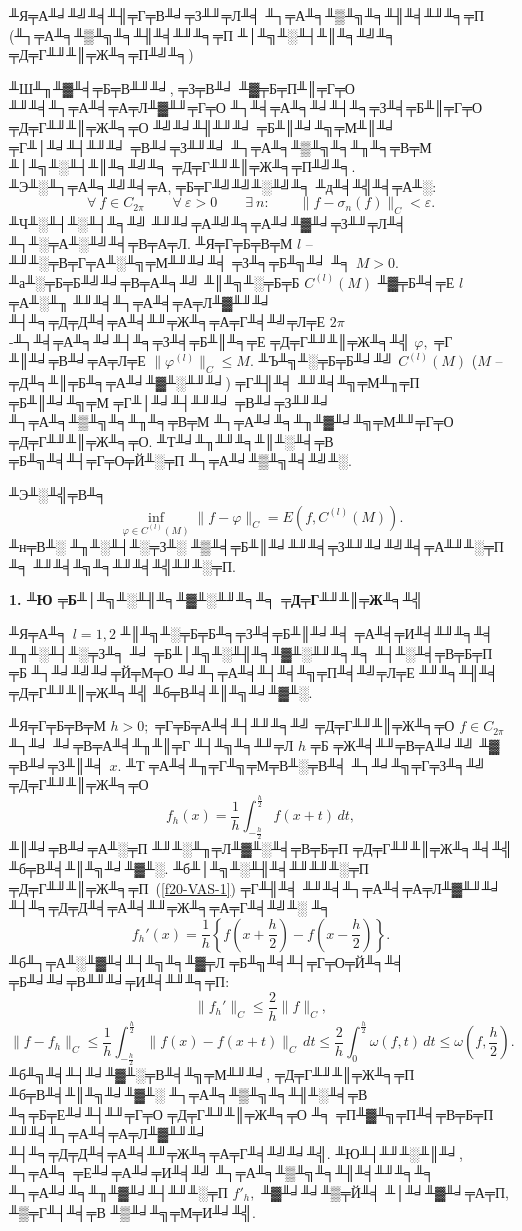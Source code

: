  {╨Я╤А╨╛╨╝╨╡╨╢╤Г╤В╨╛╤З╨╜╤Л╨╡ ╨┐╤А╨╕╨▒╨╗╨╕╨╢╨╡╨╜╨╕╤П (╨┐╤А╨╕╨▒╨╗╨╕╨╢╨╡╨╜╨╕╤П ╨│╨╗╨░╨┤╨║╨╕╨╝╨╕
 ╤Д╤Г╨╜╨║╤Ж╨╕╤П╨╝╨╕)}
 \vspace{3mm}

 ╨Ш╨╖╨▓╨╡╤Б╤В╨╜╨╛, ╤З╤В╨╛ ╨▓╤Б╤П╨║╤Г╤О ╨╜╨╡╨┐╤А╨╡╤А╤Л╨▓╨╜╤Г╤О ╨┐╨╡╤А╨╕╨╛╨┤╨╕╤З╨╡╤Б╨║╤Г╤О  ╤Д╤Г╨╜╨║╤Ж╨╕╤О ╨╝╨╛╨╢╨╜╨╛ ╤Б╨║╨╛╨╗╤М╨║╨╛ ╤Г╨│╨╛╨┤╨╜╨╛
 ╤В╨╛╤З╨╜╨╛ ╨┐╤А╨╕╨▒╨╗╨╕╨╖╨╕╤В╤М ╨│╨╗╨░╨┤╨║╨╕╨╝╨╕ ╤Д╤Г╨╜╨║╤Ж╨╕╤П╨╝╨╕. ╨Э╨░╨┐╤А╨╕╨╝╨╡╤А, ╤Б╤Г╨╝╨╝╨░╨╝╨╕
 ╨д╨╡╨╣╨╡╤А╨░:
 $$
 \forall\ f\in C_{{2\pi}}\qquad \forall\ \varepsilon>0\qquad \exists\ n:\qquad
 \|f-\sigma_n{(f)}\|_C<\varepsilon.
 $$
 ╨Ч╨░╨┤╨░╨┤╨╕╨╝ ╨╜╨╛╤А╨╝╨╕╤А╨╛╨▓╨╛╤З╨╜╤Л╨╡ ╨┐╨░╤А╨░╨╝╨╡╤В╤А╤Л. ╨Я╤Г╤Б╤В╤М $l$
 -- ╨╜╨░╤В╤Г╤А╨░╨╗╤М╨╜╨╛╨╡ ╤З╨╕╤Б╨╗╨╛ ╨╕ $M>0.$ ╨а╨░╤Б╤Б╨╝╨╛╤В╤А╨╕╨╝ ╨║╨╗╨░╤Б╤Б $C^{(l)}(M)$ ╨▓╤Б╨╡╤Е
 $l$ ╤А╨░╨╖ ╨╜╨╡╨┐╤А╨╡╤А╤Л╨▓╨╜╨╛ ╨┤╨╕╤Д╤Д╨╡╤А╨╡╨╜╤Ж╨╕╤А╤Г╨╡╨╝╤Л╤Е $2\pi$-╨┐╨╡╤А╨╕╨╛╨┤╨╕╤З╨╡╤Б╨║╨╕╤Е
 ╤Д╤Г╨╜╨║╤Ж╨╕╨╣ $\varphi,$ ╤Г ╨║╨╛╤В╨╛╤А╤Л╤Е  $\|\varphi^{(l)}\|_C\le M.$
 ╨Ъ╨╗╨░╤Б╤Б╨╛╨╝ $C^{(l)}(M)$ ($M$ -- ╤Д╨╕╨║╤Б╨╕╤А╨╛╨▓╨░╨╜╨╛) ╤Г╨╢╨╡ ╨╜╨╡╨╗╤М╨╖╤П  ╤Б╨║╨╛╨╗╤М ╤Г╨│╨╛╨┤╨╜╨╛ ╤В╨╛╤З╨╜╨╛
 ╨┐╤А╨╕╨▒╨╗╨╕╨╖╨╕╤В╤М ╨┐╤А╨╛╨╕╨╖╨▓╨╛╨╗╤М╨╜╤Г╤О
 ╤Д╤Г╨╜╨║╤Ж╨╕╤О. ╨Т╨╛╨╖╨╜╨╕╨║╨░╨╡╤В ╤Б╨╗╨╡╨┤╤Г╤О╤Й╨░╤П ╨┐╤А╨╛╨▒╨╗╨╡╨╝╨░.

 \task %
 ╨Э╨░╨╣╤В╨╕
 $$
 \inf_{\varphi\in C^{(l)}(M)} \|f-\varphi\|_C=E(f,C^{(l)}(M)).
 $$
 ╨н╤В╨░ ╨╖╨░╨┤╨░╤З╨░ ╨▒╨╡╤Б╨║╨╛╨╜╨╡╤З╨╜╨╛╨╝╨╡╤А╨╜╨░╤П ╨╕ ╨╜╨╡╨╗╨╕╨╜╨╡╨╣╨╜╨░╤П.

\vspace{3mm}
 {\bf 1. ╨Ю ╤Б╨│╨╗╨░╨╢╨╕╨▓╨░╨╜╨╕╨╕ ╤Д╤Г╨╜╨║╤Ж╨╕╨╣}
 \vspace{3mm}

 ╨Я╤А╨╕ $l=1,2$ ╨║╨╗╨░╤Б╤Б╨╕╤З╨╡╤Б╨║╨╛╨╡ ╤А╨╡╤И╨╡╨╜╨╕╨╡ ╨╖╨░╨┤╨░╤З╨╕ ╨╛ ╤Б╨│╨╗╨░╨╢╨╕╨▓╨░╨╜╨╕╨╕ ╨┤╨░╨╡╤В╤Б╤П
 ╤Б ╨┐╨╛╨╝╨╛╤Й╤М╤О ╨╛╨┐╤А╨╡╨┤╨╡╨╗╤П╨╡╨╝╤Л╤Е ╨╜╨╕╨╢╨╡ ╤Д╤Г╨╜╨║╤Ж╨╕╨╣ ╨б╤В╨╡╨║╨╗╨╛╨▓╨░.

 ╨Я╤Г╤Б╤В╤М $h>0;$ ╤Г╤Б╤А╨╡╨┤╨╜╨╕╨╝ ╤Д╤Г╨╜╨║╤Ж╨╕╤О $f{\in C_{2\pi}}$ ╨┐╨╛ ╨╛╤В╤А╨╡╨╖╨║╤Г
 ╨┤╨╗╨╕╨╜╤Л $h$ ╤Б ╤Ж╨╡╨╜╤В╤А╨╛╨╝ ╨▓ ╤В╨╛╤З╨║╨╡ $x.$  ╨Т ╤А╨╡╨╖╤Г╨╗╤М╤В╨░╤В╨╡ ╨┐╨╛╨╗╤Г╤З╨╕╨╝ ╤Д╤Г╨╜╨║╤Ж╨╕╤О
    \begin{equation}\label{f20-VAS-1}
  f_h(x)=\frac{1}{h}
 \int_{-\frac{h}{2}}^{\frac{h}{2}} f(x+t)\, dt,
\end{equation}
 ╨║╨╛╤В╨╛╤А╨░╤П ╨╜╨░╨╖╤Л╨▓╨░╨╡╤В╤Б╤П  ╤Д╤Г╨╜╨║╤Ж╨╕╨╡╨╣ ╨б╤В╨╡╨║╨╗╨╛╨▓╨░. ╨б╨│╨╗╨░╨╢╨╡╨╜╨╜╨░╤П ╤Д╤Г╨╜╨║╤Ж╨╕╤П~(\ref{f20-VAS-1})
 ╤Г╨╢╨╡ ╨╜╨╡╨┐╤А╨╡╤А╤Л╨▓╨╜╨╛ ╨┤╨╕╤Д╤Д╨╡╤А╨╡╨╜╤Ж╨╕╤А╤Г╨╡╨╝╨░ ╨╕
 $$
 f_h'(x)=\frac{1}{h} \left\{ f\left( x+\frac{h}{2}\right)-f\left(
 x-\frac{h}{2}\right)\right\}.
 $$
 ╨б╨┐╤А╨░╨▓╨╡╨┤╨╗╨╕╨▓╤Л ╤Б╨╗╨╡╨┤╤Г╤О╤Й╨╕╨╡ ╤Б╨╛╨╛╤В╨╜╨╛╤И╨╡╨╜╨╕╤П:
 $$
 \|f_h'\|_C\le \frac{2}{h}\|f\|_C,
 $$
 $$
 \|f-f_h\|_C\le \frac{1}{h}
 \int_{-\frac{{h}}{2}}^{\frac{{h}}{2}} \| f(x)-f(x+t)\|_C\, dt\le
 \frac{2}{h}
 \int_{0}^{\frac{h}{2}} \omega(f,t)\, dt\le \omega\left(
 f,\frac{h}{2}\right).
 $$
 ╨б╨╗╨╡╨┤╨╛╨▓╨░╤В╨╡╨╗╤М╨╜╨╛, ╤Д╤Г╨╜╨║╤Ж╨╕╤П ╨б╤В╨╡╨║╨╗╨╛╨▓╨░ ╨┐╤А╨╕╨▒╨╗╨╕╨╢╨░╨╡╤В ╨╕╤Б╤Е╨╛╨┤╨╜╤Г╤О ╤Д╤Г╨╜╨║╤Ж╨╕╤О ╨╕ ╤П╨▓╨╗╤П╨╡╤В╤Б╤П ╨╜╨╡╨┐╤А╨╡╤А╤Л╨▓╨╜╨╛
 ╨┤╨╕╤Д╤Д╨╡╤А╨╡╨╜╤Ж╨╕╤А╤Г╨╡╨╝╨╛╨╣. ╨Ю╨┤╨╜╨░╨║╨╛, ╨┐╤А╨╕ ╤Е╨╛╤А╨╛╤И╨╡╨╝ ╨┐╤А╨╕╨▒╨╗╨╕╨╢╨╡╨╜╨╕╨╕ ╨┐╤А╨╛╨╕╨╖╨▓╨╛╨┤╨╜╨░╤П $f'_h,$ ╨▓╨╛╨╛╨▒╤Й╨╡ ╨│╨╛╨▓╨╛╤А╤П,
 ╨▒╤Г╨┤╨╡╤В ╨▒╨╛╨╗╤М╤И╨╛╨╣.

